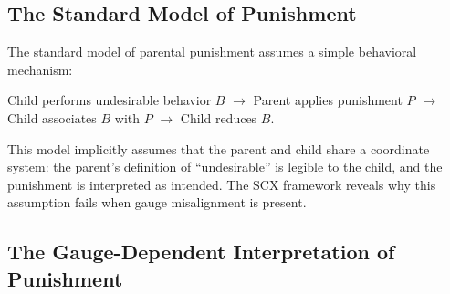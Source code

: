 \documentclass[11pt,a4paper]{article}
\begin{document}
\subsection{The Standard Model of Punishment}

The standard model of parental punishment assumes a simple behavioral mechanism:

\begin{center}
Child performs undesirable behavior $B$ $\to$ Parent applies punishment $P$ $\to$ Child associates $B$ with $P$ $\to$ Child reduces $B$.
\end{center}

This model implicitly assumes that the parent and child share a coordinate system: the parent's definition of ``undesirable'' is legible to the child, and the punishment is interpreted as intended. The SCX framework reveals why this assumption fails when gauge misalignment is present.

\subsection{The Gauge-Dependent Interpretation of Punishment}
\end{document}
